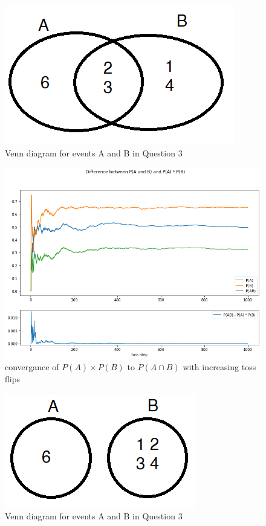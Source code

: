 \documentclass[12pt, a4paper]{book}
\begin{document}
\begin{figure}[h]
    \centering
    \includegraphics*[width=0.4\linewidth]{images/question3/question3_venn1.png}
    \caption{Venn diagram for events A and B in Question 3}
    \label{question3_venn1}
\end{figure}

\begin{figure}[h]
    \centering
    \includegraphics*[width=0.8\linewidth]{images/question3/conv_pAb.png}
    \caption{convergance of $P(A)\times P(B)$ to $P(A\cap B)$ with increasing toss flips}
    \label{question3_conv_pAB}
\end{figure}

\begin{figure}[h]
    \centering
    \includegraphics*[width=0.4\linewidth]{images/question3/question3_venn2.png}
    \caption{Venn diagram for events A and B in Question 3}
    \label{question3_venn2}
\end{figure}
\end{document}

